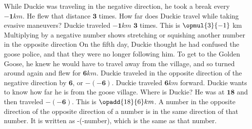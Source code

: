 {}
{While Duckie was traveling in the negative direction, he took a break every $\mathbf{-1} km$. He flew that distance  $\mathbf{3}$ times. How far does Duckie travel while taking evasive maneuvers?}
{Duckie traveled $\mathbf{-1} km$ $\mathbf{3}$ times. This is $\opmul{3}{-1}$ km}
{Multiplying by a negative number shows stretching or squishing another number in the opposite direction}
{}
{On the fifth day, Duckie thought he had confused the goose police, and that they were no longer following him. To get to the Golden Goose, he knew he would have to travel away from the village, and so turned around again and flew for $\mathbf{6} km$. Duckie traveled in the opposite direction of the negative direction by $\mathbf{6}$, or $\mathbf{-(-6)}$. Duckie traveled $\mathbf{6} km$ forward. Duckie wants to know how far he is from the goose village. Where is Duckie?}
{He was at $\mathbf{18}$ and then traveled $\mathbf{-(-6)}$. This is $\opadd{18}{6} km$.}
{A number in the opposite direction of the opposite direction of a number is in the same direction of that number. It is written as -(-number), which is the same as  that number.}
{}
